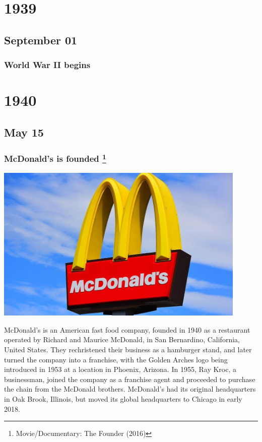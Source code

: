 \documentclass[11pt]{report}
\begin{document}
\chapter{1939}
\section{September 01}
\subsection{World War II begins}

\chapter{1940}
\section{May 15}
\subsection{McDonald's is founded \protect\footnote{Movie/Documentary: The Founder (2016)}}
\vspace{2mm}\begin{center}\includegraphics[width=12cm]{./img/mcdonalds.jpg}\end{center}
McDonald's is an American fast food company, founded in 1940 as a restaurant operated by Richard and Maurice McDonald, in San Bernardino, California, United States. They rechristened their business as a hamburger stand, and later turned the company into a franchise, with the Golden Arches logo being introduced in 1953 at a location in Phoenix, Arizona. In 1955, Ray Kroc, a businessman, joined the company as a franchise agent and proceeded to purchase the chain from the McDonald brothers. McDonald's had its original headquarters in Oak Brook, Illinois, but moved its global headquarters to Chicago in early 2018.
\end{document}

